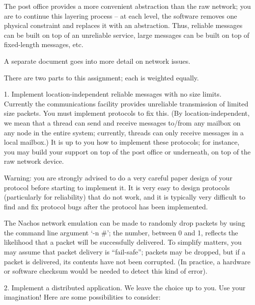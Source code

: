 The post office provides a more convenient abstraction than the raw network; 
you are to continue this layering process -- at each level, the 
software removes one physical constraint and replaces it with an abstraction.
Thus, reliable messages can be built on top of an unreliable service,
large messages can be built on top of fixed-length messages, etc.

A separate document goes into more detail on network issues. 

There are two parts to this assignment; each is weighted equally.

\begin{description}

\item{1.} Implement location-independent reliable messages with no size limits.
Currently the communications facility provides unreliable transmission
of limited size packets.  You must implement protocols to fix this.
(By location-independent, we mean that a thread can send and receive 
messages to/from any mailbox on any node in the entire system; currently,
threads can only receive messages in a local mailbox.)
It is up to you how to implement these protocols; for instance, you may 
build your support on top of the post office or underneath, on top of
the raw network device.

Warning: you are strongly advised to do a very careful paper design 
of your protocol before starting to implement it.  It is very
easy to design protocols (particularly for reliability) that do not 
work, and it is typically very difficult to find and fix protocol bugs
after the protocol has been implemented.

The Nachos network emulation can be made to randomly drop packets by 
using the command line argument `-n \#'; the number, between 0 and 1,
reflects the likelihood that a packet will be successfully delivered.
To simplify matters, you may assume that packet delivery is ``fail-safe'';
packets may be dropped, but if a packet is delivered, its contents have 
not been corrupted.  (In practice, a hardware or software checksum would
be needed to detect this kind of error).


\item{2.} Implement a distributed application.
We leave the choice up to you.  Use your imagination!
Here are some possibilities to consider: 


\end{description}

